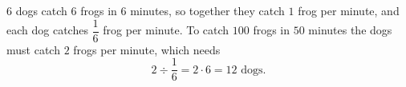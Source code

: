 $6$ dogs catch $6$ frogs in $6$ minutes, so together they catch $1$ frog per minute, and each dog catches $\dfrac{1}{6}$ frog per minute. To catch $100$ frogs in $50$ minutes the dogs must catch $2$ frogs per minute, which needs
\[2\div\dfrac{1}{6}=2\cdot6=\boxed{12}\text{ dogs}.\]
